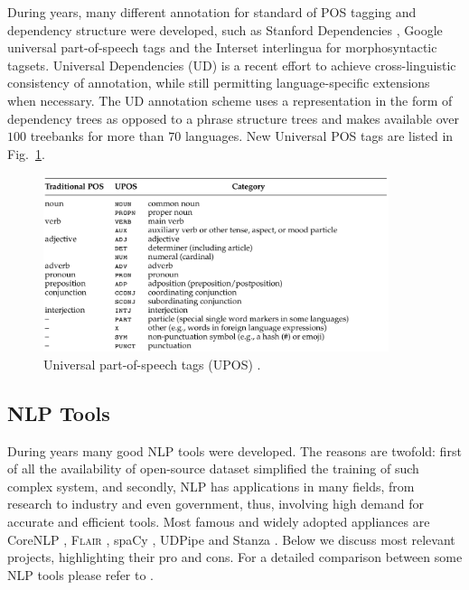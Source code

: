 During years, many different annotation for standard of POS tagging
and dependency structure were developed, such as Stanford Dependencies
\cite{de2006generating, de2008stanford, silveira2014gold}, Google
universal part-of-speech tags \cite{lin2012syntactic} and the Interset
interlingua \cite{zeman2008reusable} for morphosyntactic tagsets.
Universal Dependencies (UD) \cite{nivre2016universal,
nivre2017universal} is a recent effort to achieve cross-linguistic
consistency of annotation, while still permitting language-specific
extensions when necessary. The UD annotation scheme uses a
representation in the form of dependency trees as opposed to a phrase
structure trees and makes available over $100$ treebanks for more than
$70$ languages. New Universal POS tags are listed in
Fig.~\ref{fig:upos-tags}.

\begin{figure}
  \centering
  \includegraphics[width=0.9\textwidth]{figures/upos-tags.png}
  \caption[Universal part-of-speech tags (UPOS)]{ Universal
    part-of-speech tags (UPOS) \cite{nivre2017universal}.}
  \label{fig:upos-tags}
\end{figure}
 
\subsection{NLP Tools}
\label{subsec:nlp-tools}

During years many good NLP tools were developed. The reasons are
twofold: first of all the availability of open-source dataset
simplified the training of such complex system, and secondly, NLP has
applications in many fields, from research to industry and even
government, thus, involving high demand for accurate and efficient
tools. Most famous and widely adopted appliances are CoreNLP
\cite{manning2014stanford}, \textsc{Flair} \cite{akbik2019flair},
spaCy \cite{honnibal2020spacy}, UDPipe \cite{straka2018udpipe} and
Stanza \cite{qi2020stanza}. Below we discuss most relevant projects,
highlighting their pro and cons. For a detailed comparison between
some NLP tools please refer to \cite{schmitt2019replicable}.


